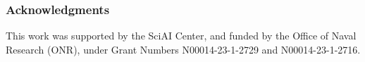 \documentclass{article} %
\begin{document}












\ificlrfinal

\subsubsection*{Acknowledgments}
This work was supported by the SciAI Center, and funded by the Office of Naval Research (ONR), under Grant Numbers N00014-23-1-2729 and N00014-23-1-2716.
\end{document}
